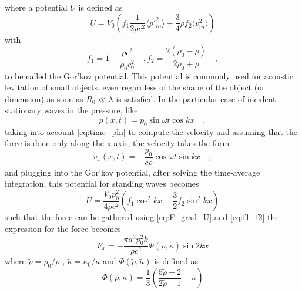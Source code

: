 where a potential $U$ is defined as
\begin{equation}
    U = V_0\left(f_1\frac{1}{2\rho c^2}\langle p'^2_{in} \rangle + \frac{3}{4}\rho f_2\langle v^2_{in} \rangle\right)
\end{equation}
with 
\begin{subequations}\label{eq:f1_f2}
    \begin{equation}
        f_1 = 1-\frac{\rho c^2}{\rho_0c_0^2}\quad,
    \end{equation}
    \begin{equation}
        f_2 = \frac{2(\rho_0-\rho)}{2\rho_0+\rho}\quad,
    \end{equation}
\end{subequations}
to be called the Gor'kov potential. This potential is commonly used for acoustic levitation of small objects, even regardless of the shape of the object (or dimension) as soon as $R_0 \ll \lambda$ is satisfied. In the particular case of incident stationary waves in the pressure, like
\begin{equation}
    p(x,t) = p_0\sin\omega t\cos kx\quad,
\end{equation}
taking into account \eqref{eq:time_phi} to compute the velocity and assuming that the force is done only along the x-axis, the velocity takes the form
\begin{equation}
    v_x(x,t) = -\frac{p_0}{c\rho}\cos\omega t\sin kx\quad,
\end{equation}
and plugging into the Gor'kov potential, after solving the time-average integration, this potential for standing waves becomes
\begin{equation}
    U = \frac{V_0p_0^2}{4\rho c^2}\left(f_1\cos^2kx+\frac{3}{2}f_2\sin^2kx\right)
\end{equation}
such that the force can be gathered using \eqref{eq:F_grad_U} and \eqref{eq:f1_f2} the expression for the force becomes
\begin{equation}
    F_x = -\frac{\pi a^3p_0^2k}{\rho c^2}\Phi(\tilde\rho,\tilde\kappa)\sin 2kx
\end{equation}
where $\tilde\rho = \rho_0/\rho$ , $\tilde\kappa = \kappa_0/\kappa$ and $\Phi(\tilde\rho,\tilde\kappa)$ is defined as
\begin{equation}
    \Phi(\tilde\rho,\tilde\kappa) = \frac{1}{3}\left(\frac{5\tilde\rho -2}{2\tilde\rho+1}-\tilde\kappa\right)
\end{equation}

\section{}

